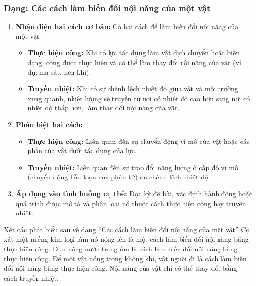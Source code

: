 \subsubsection{Dạng: Các cách làm biến đổi nội năng của một vật}
\begin{phuongphap}
\begin{enumerate}
    \item \textbf{Nhận diện hai cách cơ bản:} Có hai cách để làm biến đổi nội năng của một vật:
    \begin{itemize}
        \item \textbf{Thực hiện công:} Khi có lực tác dụng làm vật dịch chuyển hoặc biến dạng, công được thực hiện và có thể làm thay đổi nội năng của vật (ví dụ: ma sát, nén khí).
        \item \textbf{Truyền nhiệt:} Khi có sự chênh lệch nhiệt độ giữa vật và môi trường xung quanh, nhiệt lượng sẽ truyền từ nơi có nhiệt độ cao hơn sang nơi có nhiệt độ thấp hơn, làm thay đổi nội năng của vật.
    \end{itemize}
    \item \textbf{Phân biệt hai cách:}
    \begin{itemize}
        \item \textbf{Thực hiện công:} Liên quan đến sự chuyển động vĩ mô của vật hoặc các phần của vật dưới tác dụng của lực.
        \item \textbf{Truyền nhiệt:} Liên quan đến sự trao đổi năng lượng ở cấp độ vi mô (chuyển động hỗn loạn của phân tử) do chênh lệch nhiệt độ.
    \end{itemize}
    \item \textbf{Áp dụng vào tình huống cụ thể:} Đọc kỹ đề bài, xác định hành động hoặc quá trình được mô tả và phân loại nó thuộc cách thực hiện công hay truyền nhiệt.
\end{enumerate}
\end{phuongphap}
\begin{vidumau}
Xét các phát biểu sau về dạng “Các cách làm biến đổi nội năng của một vật”
\choice
{\True Cọ xát một miếng kim loại làm nó nóng lên là một cách làm biến đổi nội năng bằng thực hiện công.}
{Đun nóng nước trong ấm là cách làm biến đổi nội năng bằng thực hiện công.}
{Để một vật nóng trong không khí, vật nguội đi là cách làm biến đổi nội năng bằng thực hiện công.}
{Nội năng của vật chỉ có thể thay đổi bằng cách truyền nhiệt.}
\end{vidumau}

